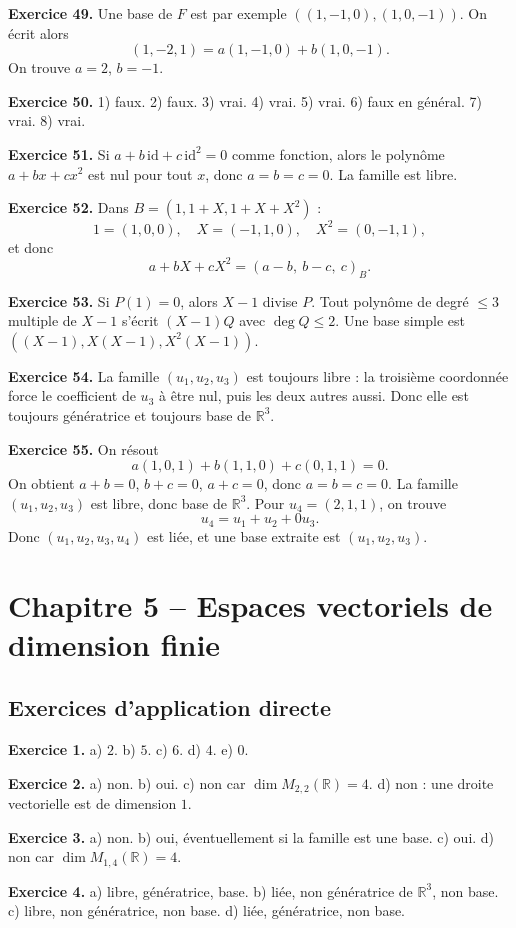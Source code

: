 \documentclass[11pt,a4paper]{article}
\newcommand{\R}{\mathbb R}
\newcommand{\id}{\mathrm{id}}
\begin{document}
\textbf{Exercice 49.} Une base de $F$ est par exemple $((1,-1,0),(1,0,-1))$. On écrit alors
\[(1,-2,1)=a(1,-1,0)+b(1,0,-1).
\]
On trouve $a=2$, $b=-1$.

\textbf{Exercice 50.} 1) faux. 2) faux. 3) vrai. 4) vrai. 5) vrai. 6) faux en général. 7) vrai. 8) vrai.

\textbf{Exercice 51.} Si $a+b\,\id+c\,\id^2=0$ comme fonction, alors le polynôme $a+bx+cx^2$ est nul pour tout $x$, donc $a=b=c=0$. La famille est libre.

\textbf{Exercice 52.} Dans $B=(1,1+X,1+X+X^2)$ :
\[1=(1,0,0),\quad X=(-1,1,0),\quad X^2=(0,-1,1),\]
et donc
\[a+bX+cX^2=(a-b,\ b-c,\ c)_B.\]

\textbf{Exercice 53.} Si $P(1)=0$, alors $X-1$ divise $P$. Tout polynôme de degré $\le 3$ multiple de $X-1$ s'écrit $(X-1)Q$ avec $\deg Q\le 2$. Une base simple est $((X-1),X(X-1),X^2(X-1))$.

\textbf{Exercice 54.} La famille $(u_1,u_2,u_3)$ est toujours libre : la troisième coordonnée force le coefficient de $u_3$ à être nul, puis les deux autres aussi. Donc elle est toujours génératrice et toujours base de $\R^3$.

\textbf{Exercice 55.} On résout
\[a(1,0,1)+b(1,1,0)+c(0,1,1)=0.
\]
On obtient $a+b=0$, $b+c=0$, $a+c=0$, donc $a=b=c=0$. La famille $(u_1,u_2,u_3)$ est libre, donc base de $\R^3$. Pour $u_4=(2,1,1)$, on trouve
\[u_4=u_1+u_2+0u_3.
\]
Donc $(u_1,u_2,u_3,u_4)$ est liée, et une base extraite est $(u_1,u_2,u_3)$.

\newpage
\section{Chapitre 5 -- Espaces vectoriels de dimension finie}
\subsection*{Exercices d'application directe}
\textbf{Exercice 1.} a) $2$. b) $5$. c) $6$. d) $4$. e) $0$.

\textbf{Exercice 2.} a) non. b) oui. c) non car $\dim M_{2,2}(\R)=4$. d) non : une droite vectorielle est de dimension $1$.

\textbf{Exercice 3.} a) non. b) oui, éventuellement si la famille est une base. c) oui. d) non car $\dim M_{1,4}(\R)=4$.

\textbf{Exercice 4.} a) libre, génératrice, base. b) liée, non génératrice de $\R^3$, non base. c) libre, non génératrice, non base. d) liée, génératrice, non base.
\end{document}
